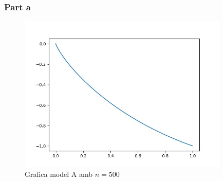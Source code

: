 \documentclass[12pt, a4papre]{article}
\begin{document}
	\subsubsection{Part a}
	\begin{figure}[H]
		\begin{center}
		\includegraphics[width=100mm]{modelA500.jpg}
		\end{center}
		\caption{Grafica model A amb $n = 500$}
		

\end{figure}
\end{document}
